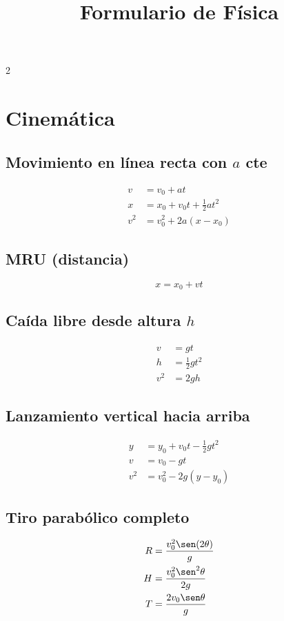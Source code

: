 \documentclass[10pt]{article}
\title{\textbf{Formulario de Física}}
\author{}
\date{}
\begin{document}
\maketitle

\begin{multicols}{2}

\section*{Cinemática}

\subsection*{Movimiento en línea recta con \(a\) cte}
\begin{align*}
    v &= v_0 + a t \\
    x &= x_0 + v_0 t + \tfrac{1}{2} a t^2 \\
    v^2 &= v_0^2 + 2a (x - x_0)
\end{align*}

\subsection*{MRU (distancia)}
\[
x = x_0 + v t
\]

\subsection*{Caída libre desde altura \(h\)}
\begin{align*}
    v &= g t \\
    h &= \tfrac{1}{2} g t^2 \\
    v^2 &= 2 g h
\end{align*}

\subsection*{Lanzamiento vertical hacia arriba}
\begin{align*}
    y &= y_0 + v_0 t - \tfrac{1}{2} g t^2 \\
    v &= v_0 - g t \\
    v^2 &= v_0^2 - 2g (y - y_0)
\end{align*}

\subsection*{Tiro parabólico completo}
\begin{align*}
    R &= \frac{v_0^2 \sen(2\theta)}{g} \\
    H &= \frac{v_0^2 \sen^2\theta}{2g} \\
    T &= \frac{2 v_0 \sen\theta}{g}
\end{align*}


\end{multicols}
\end{document}
